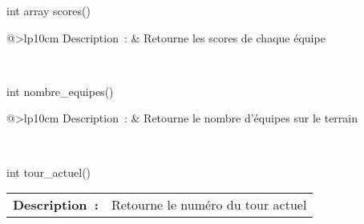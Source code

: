 \begin{minipage}{\linewidth}

\begin{lst-c++}
int array scores()
\end{lst-c++}

\noindent
\begin{tabular}[t]{@{\extracolsep{0pt}}>{\bfseries}lp{10cm}}
Description~: & Retourne les scores de chaque équipe \\







\end{tabular} \\[0.3cm]
\end{minipage}


\begin{minipage}{\linewidth}

\begin{lst-c++}
int nombre_equipes()
\end{lst-c++}

\noindent
\begin{tabular}[t]{@{\extracolsep{0pt}}>{\bfseries}lp{10cm}}
Description~: & Retourne le nombre d'équipes sur le terrain \\







\end{tabular} \\[0.3cm]
\end{minipage}


\begin{minipage}{\linewidth}

\begin{lst-c++}
int tour_actuel()
\end{lst-c++}

\noindent
\begin{tabular}[t]{@{\extracolsep{0pt}}>{\bfseries}lp{10cm}}
Description~: & Retourne le numéro du tour actuel \\







\end{tabular} \\[0.3cm]
\end{minipage}


